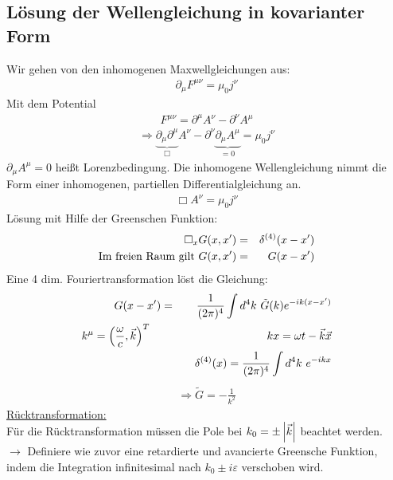 \subsection{Lösung der Wellengleichung in kovarianter Form}
Wir gehen von den inhomogenen Maxwellgleichungen aus:
\begin{eqnarray*} \partial_{\mu}F^ {\mu\nu} = \mu_0 j^ {\nu} \end{eqnarray*}
Mit dem Potential 
\begin{eqnarray*} F^ {\mu\nu} = \partial ^ {\mu}A^ {\nu} - \partial^ {\nu}A^ {\mu}\end{eqnarray*}
\begin{eqnarray*} \Longrightarrow \underbrace{\partial_{\mu}\partial^ {\mu}}_{\Box} A^ {\nu} - \partial^ {\nu} \underbrace{\partial_{\mu}A^ {\mu}}_{=0} = \mu_0j^{\nu}
\end{eqnarray*}
$\partial_ {\mu}A^ {\mu} = 0$ heißt Lorenzbedingung. Die inhomogene Wellengleichung nimmt die Form einer inhomogenen, partiellen Differentialgleichung an.
\begin{eqnarray*} \boxed{\Box A^ {\nu} = \mu_0 j^ {\nu}}\end{eqnarray*}
Lösung mit Hilfe der Greenschen Funktion:
\begin{eqnarray*} \Box_xG(x,x') &=& \delta^ {(4)}(x-x')\\
\text{Im freien Raum gilt   } G(x,x') &=& G(x-x')
\end{eqnarray*}
Eine 4 dim. Fouriertransformation löst die Gleichung:
\begin{eqnarray*}
G(x-x') \g \frac 1 {(2\pi)^ 4} \int d^ 4 k \ \tilde G(k) e^ {-ik(x-x') }\\
 k^ {\mu} = \Big ( \frac {\omega}c ,\vec k\Big)^T \quad  &{}&\quad k x = \omega t - \vec k\vec x\\
&{}& \quad \delta^ {(4)} (x) = \frac 1 {(2 \pi)^ 4} \int d^ 4k\ e^ {-ikx}\end{eqnarray*}
\begin{eqnarray*} \Longrightarrow \boxed{\tilde G = - \frac 1 {k^ 2}}
\end{eqnarray*}
\underline {Rücktransformation:}\\
Für die Rücktransformation müssen die Pole bei $k_0 = \pm \left|\vec k\right|$ beachtet werden.\\
$\longrightarrow$ Definiere wie zuvor eine retardierte und avancierte Greensche Funktion, indem die Integration infinitesimal nach $k_0 \pm i\varepsilon$ verschoben wird.\\ \\

